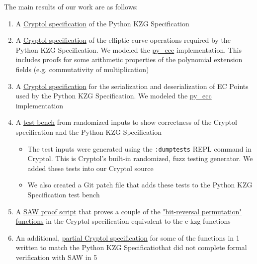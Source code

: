 \documentclass[12pt]{galois-whitepaper}
\begin{document}
The main results of our work are as follows:
\begin{enumerate}
    \item A \href{https://github.com/GaloisInc/ckzg-eip-4844-verification/tree/main/spec/Spec}{Cryptol specification}
          of the Python KZG Specification
    \item A \href{https://github.com/GaloisInc/ckzg-eip-4844-verification/tree/main/spec/Spec/BlsEC}{Cryptol specification}
          of the elliptic curve operations required by the Python KZG Specification.
          We modeled the \href{https://github.com/ethereum/py_ecc}{py\_ecc} implementation.
          This includes proofs for some arithmetic properties of the polynomial extension
          fields (e.g. commutativity of multiplication)
    \item A \href{https://github.com/GaloisInc/ckzg-eip-4844-verification/blob/main/spec/Spec/BlsSerde.cry}{Cryptol specification}
          for the serialization and deserialization of EC Points used by the Python KZG Specification.
          We modeled the \href{https://github.com/ethereum/py_ecc}{py\_ecc} implementation
    \item A \href{https://github.com/GaloisInc/ckzg-eip-4844-verification/tree/main/spec/TestVectors}{test bench}
          from randomized inputs to show correctness of the Cryptol specification and the Python KZG Specification
          \begin{itemize}
                \item The test inputs were generated using the \texttt{:dumptests} REPL command in Cryptol.
                This is Cryptol's built-in randomized, fuzz testing generator. We added these tests into our Cryptol source
                \item We also created a Git patch file that adds these tests to the Python KZG Specification test bench
          \end{itemize}
    \item A \href{https://github.com/GaloisInc/ckzg-eip-4844-verification/tree/main/proof}{SAW proof script}
          that proves a couple of the \href{https://github.com/ethereum/consensus-specs/blob/68d32accf945a84f69d4c779cb6c71223a311eac/specs/deneb/polynomial-commitments.md\#bit-reversal-permutation}
          {"bit-reversal permutation" functions} in the Cryptol specification equivalent to the c-kzg functions
    \item An additional, \href{https://github.com/GaloisInc/ckzg-eip-4844-verification/tree/main/spec/LLVM}{partial Cryptol specification}
          for some of the functions in 1 written to match the Python KZG Specificatiothat did not complete
          formal verification with SAW in 5
\end{enumerate}
\end{document}
